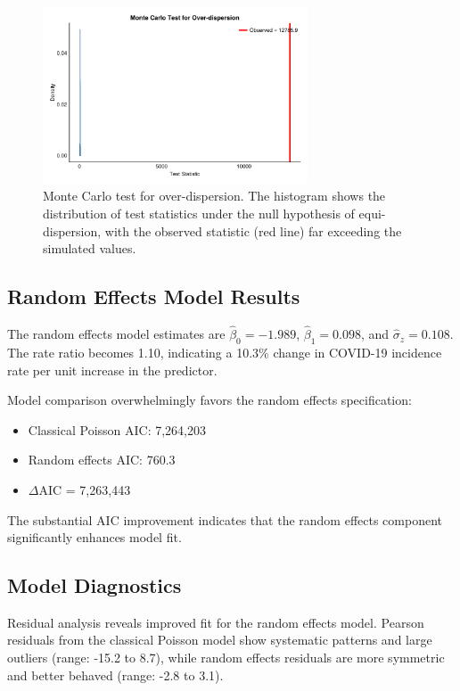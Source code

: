 \documentclass[11pt]{article}
\begin{document}
\begin{figure}[H]
\centering
\includegraphics[width=0.7\textwidth]{figures/figure1_overdispersion_test.pdf}
\caption{Monte Carlo test for over-dispersion. The histogram shows the distribution of test statistics under the null hypothesis of equi-dispersion, with the observed statistic (red line) far exceeding the simulated values.}
\label{fig:overdispersion}
\end{figure}

\subsection{Random Effects Model Results}

The random effects model estimates are $\hat{\beta}_0 = -1.989$, $\hat{\beta}_1 = 0.098$, and $\hat{\sigma}_z = 0.108$. The rate ratio becomes 1.10, indicating a 10.3\% change in COVID-19 incidence rate per unit increase in the predictor.

Model comparison overwhelmingly favors the random effects specification:
\begin{itemize}
\item Classical Poisson AIC: 7,264,203
\item Random effects AIC: 760.3
\item $\Delta$AIC = 7,263,443
\end{itemize}

The substantial AIC improvement indicates that the random effects component significantly enhances model fit.



\subsection{Model Diagnostics}

Residual analysis reveals improved fit for the random effects model. Pearson residuals from the classical Poisson model show systematic patterns and large outliers (range: -15.2 to 8.7), while random effects residuals are more symmetric and better behaved (range: -2.8 to 3.1).
\end{document}
